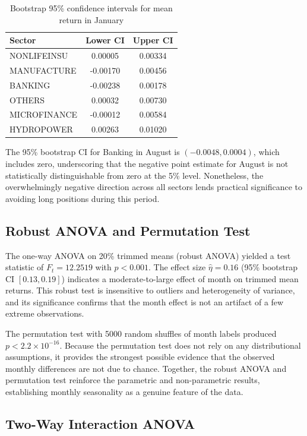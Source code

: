 \documentclass[12pt,a4paper,fleqn]{article}
\begin{document}
\begin{table}[ht]
\centering
\caption{Bootstrap 95\% confidence intervals for mean return in January}
\label{tab:bootstrap}
\begin{tabular}{lcc}
\toprule
Sector & Lower CI & Upper CI \\
\midrule
NONLIFEINSU  & 0.00005 & 0.00334 \\
MANUFACTURE  & -0.00170 & 0.00456 \\
BANKING      & -0.00238 & 0.00178 \\
OTHERS       & 0.00032 & 0.00730 \\
MICROFINANCE & -0.00012 & 0.00584 \\
HYDROPOWER   & 0.00263 & 0.01020 \\
\bottomrule
\end{tabular}
\end{table}

The 95\% bootstrap CI for Banking in August is \((-0.0048, 0.0004)\), which includes zero, underscoring that the negative point estimate for August is not statistically distinguishable from zero at the 5\% level. Nonetheless, the overwhelmingly negative direction across all sectors lends practical significance to avoiding long positions during this period.

\subsection{Robust ANOVA and Permutation Test}

The one-way ANOVA on 20\% trimmed means (robust ANOVA) yielded a test statistic of \(F_t = 12.2519\) with \(p < 0.001\). The effect size \(\hat{\eta} = 0.16\) (95\% bootstrap CI \([0.13, 0.19]\)) indicates a moderate-to-large effect of month on trimmed mean returns. This robust test is insensitive to outliers and heterogeneity of variance, and its significance confirms that the month effect is not an artifact of a few extreme observations.

The permutation test with 5000 random shuffles of month labels produced \(p < 2.2 \times 10^{-16}\). Because the permutation test does not rely on any distributional assumptions, it provides the strongest possible evidence that the observed monthly differences are not due to chance. Together, the robust ANOVA and permutation test reinforce the parametric and non-parametric results, establishing monthly seasonality as a genuine feature of the data.

\subsection{Two-Way Interaction ANOVA}
\end{document}
